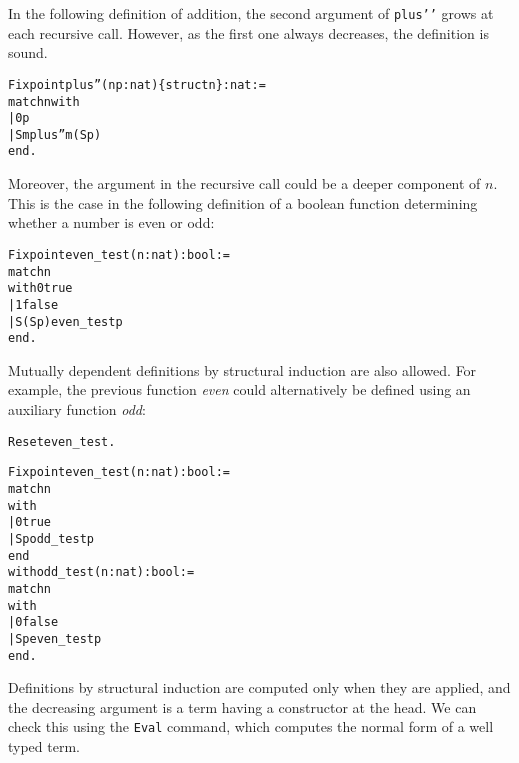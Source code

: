 \documentclass[11pt]{article}
\newtheorem{exercise}{Exercise}[section]
\begin{document}

In the following definition of addition, 
the second argument of {\tt plus{'}{'}} grows at each
recursive call. However, as the first one always decreases, the
definition is sound.
\begin{alltt}
Fixpoint plus'' (n p:nat) \{struct n\} : nat :=
 match n with
          | 0 {\funarrow} p
          | S m {\funarrow} plus'' m (S p)
 end.
\end{alltt}

 Moreover, the argument in the recursive call
could be a deeper component of $n$.  This is the case in the following
definition of a boolean function determining whether a number is even
or odd:

\begin{alltt} 
Fixpoint even_test (n:nat) : bool :=
  match n 
  with 0 {\funarrow}  true
     | 1 {\funarrow}  false
     | S (S p) {\funarrow} even_test p
  end.
\end{alltt}

Mutually dependent definitions by structural induction are also
allowed. For example, the previous function \textsl{even} could alternatively
be defined using an auxiliary function \textsl{odd}:

\begin{alltt}
Reset even_test.



Fixpoint even_test (n:nat) : bool :=
  match n 
  with 
      | 0 {\funarrow}  true
      | S p {\funarrow} odd_test p
  end
with odd_test (n:nat) : bool :=
  match n
  with 
     | 0 {\funarrow} false
     | S p {\funarrow} even_test p
 end.
\end{alltt}


Definitions by structural induction are computed 
 only when they are applied, and the decreasing argument
is a term having a constructor at the head. We can check this using
the \texttt{Eval} command, which computes the normal form of a well
typed term.
\end{document}
